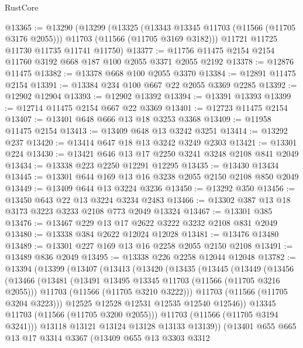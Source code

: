 \begin{lexlean}{RustCore}
\begin{coremodule}
@13365 := @13290
    (@13299
      (@13325
        (@13343 @13345 @11703 (@11566 (@11705 @3176 @2055)))
        @11703
        (@11566 (@11705 @3169 @3182)))
      @11721
      @11725
      @11730
      @11735
      @11741
      @11750)
@13377 := @11756 @11475 @2154 @2154 @11760 @3192 @668 @187 @100 @2055 @3371 @2055 @2192
@13378 := @12876 @11475
@13382 := @13378 @668 @100 @2055 @3370
@13384 := @12891 @11475 @2154
@13391 := @13384 @234 @100 @667 @22 @2055 @3369 @2285
@13392 := @12902 @12904
@13393 := @12902 @13392
@13394 := @13391 @13393
@13399 := @12714 @11475 @2154 @667 @22 @3369
@13401 := @12723 @11475 @2154
@13407 := @13401 @648 @666 @13 @18 @3253 @3368
@13409 := @11958 @11475 @2154
@13413 := @13409 @648 @13 @3242 @3251
@13414 := @13292 @237
@13420 := @13414 @647 @18 @13 @3242 @3249 @2303
@13421 := @13301 @224
@13430 := @13421 @646 @13 @17 @2250 @3241 @3248 @2108 @841 @2049
@13434 := @13338 @223 @2250 @12291 @12295
@13435 := @13430 @13434
@13445 := @13301 @644 @169 @13 @16 @3238 @2055 @2150 @2108 @850 @2049
@13449 := @13409 @644 @13 @3224 @3236
@13450 := @13292 @350
@13456 := @13450 @643 @22 @13 @3224 @3234 @2483
@13466 := @13302 @387 @13 @18 @3173 @3223 @3233 @2108 @773 @2049 @13324
@13467 := @13301 @385
@13476 := @13467 @229 @13 @17 @2622 @3222 @3232 @2108 @831 @2049
@13480 := @13338 @384 @2622 @12024 @12028
@13481 := @13476 @13480
@13489 := @13301 @227 @169 @13 @16 @2258 @2055 @2150 @2108
@13491 := @13489 @836 @2049
@13495 := @13338 @226 @2258 @12044 @12048
@13782 := @13394
    (@13399
      (@13407
        (@13413
          (@13420
            (@13435
              (@13445
                (@13449
                  (@13456
                    (@13466
                      (@13481
                        (@13491 @13495 @13345 @11703 (@11566 (@11705 @3216 @2055)))
                        @11703
                        (@11566 (@11705 @3210 @3222)))
                      @11703
                      (@11566 (@11705 @3204 @3223)))
                    @12525
                    @12528
                    @12531
                    @12535
                    @12540
                    @12546))
                @13345
                @11703
                (@11566 (@11705 @3200 @2055)))
              @11703
              (@11566 (@11705 @3194 @3241)))
            @13118
            @13121
            @13124
            @13128
            @13133
            @13139))
        (@13401
          @655
          @665
          @13
          @17
          @3314
          @3367
          (@13409
            @655
            @13
            @3303
            @3312

\end{coremodule}
\end{lexlean}
